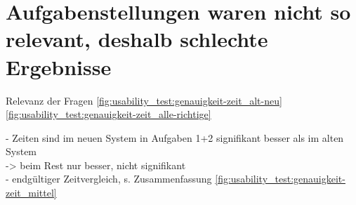 \section{Aufgabenstellungen waren nicht so relevant, deshalb schlechte Ergebnisse}
Relevanz der Fragen \autoref{fig:usability_test:genauigkeit-zeit_alt-neu} \autoref{fig:usability_test:genauigkeit-zeit_alle-richtige}

\noindent
- Zeiten sind im neuen System in Aufgaben 1+2 signifikant besser als im alten System\\
-> beim Rest nur besser, nicht signifikant\\
- endgültiger Zeitvergleich, s. Zusammenfassung \autoref{fig:usability_test:genauigkeit-zeit_mittel}